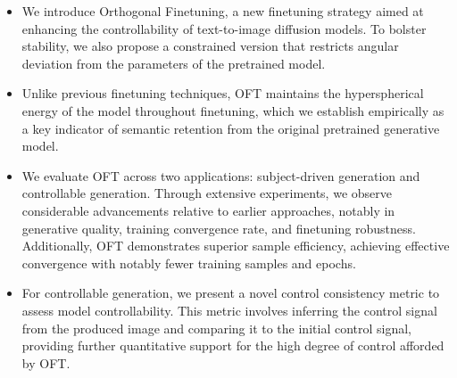 \begin{itemize}[leftmargin=*,nosep]

Typical orthogonalization procedures, such as the Gram-Schmidt process, although differentiable, tend to incur considerable computational overhead in real-world scenarios~\cite{liu2021orthogonal}. To achieve higher efficiency, we employ the Cayley parameterization for orthogonal matrix construction. Explicitly, we express the orthogonal matrix as $\thickmuskip=2mu \medmuskip=2mu \bm{R}=(\bm{I}+\bm{Q})(I-\bm{Q})^{-1}$, with $\bm{Q}$ denoting a skew-symmetric matrix such that $\thickmuskip=2mu \medmuskip=2mu \bm{Q}=-\bm{Q}^\top$. The gain in computational tractability is accompanied by a slight restriction: matrices produced via Cayley parameterization have a determinant equal to $1$, thus forming part of the special orthogonal group. Empirically, we observe that this constraint has negligible influence on actual model performance. However, parameterizing $\bm{R}$ via the Cayley transform can result in substantial parameter count, especially when $d$ is large. To mitigate this inefficiency, we recommend decomposing $\bm{R}$ as a block-diagonal matrix with $r$ constituent blocks, yielding:

    \item We introduce Orthogonal Finetuning, a new finetuning strategy aimed at enhancing the controllability of text-to-image diffusion models. To bolster stability, we also propose a constrained version that restricts angular deviation from the parameters of the pretrained model.
    \item Unlike previous finetuning techniques, OFT maintains the hyperspherical energy of the model throughout finetuning, which we establish empirically as a key indicator of semantic retention from the original pretrained generative model.
    \item We evaluate OFT across two applications: subject-driven generation and controllable generation. Through extensive experiments, we observe considerable advancements relative to earlier approaches, notably in generative quality, training convergence rate, and finetuning robustness. Additionally, OFT demonstrates superior sample efficiency, achieving effective convergence with notably fewer training samples and epochs.
    \item For controllable generation, we present a novel control consistency metric to assess model controllability. This metric involves inferring the control signal from the produced image and comparing it to the initial control signal, providing further quantitative support for the high degree of control afforded by OFT.
\end{itemize}

